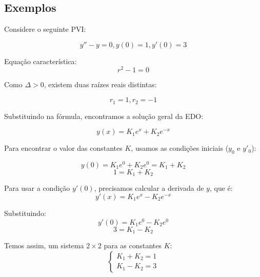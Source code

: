 \documentclass[a4paper]{article}
\begin{document}
\subsection{Exemplos}

\begin{multicols}{2}
Considere o seguinte PVI:

\begin{displaymath}
  y''-y=0, y(0)=1, y'(0)=3
\end{displaymath}

Equação característica:
\begin{displaymath}
  r^2-1=0
\end{displaymath}

Como $\Delta>0$, existem duas raízes reais distintas:

\begin{displaymath}
  r_1 = 1, r_2=-1
\end{displaymath}

Substituindo na fórmula, encontramos a solução geral da EDO:

\begin{displaymath}
  y(x) = K_1e^x+K_2e^{-x}
\end{displaymath}

Para encontrar o valor das constantes $K$, usamos as condições
iniciais ($y_0$ e $y'_0$):

\begin{displaymath}
  y(0) = K_1e^0+K_2e^0 = K_1 + K_2
\end{displaymath}
\begin{displaymath}
  1=K_1+K_2
\end{displaymath}

Para usar a condição $y'(0)$, precisamos calcular a derivada de $y$,
que é:
\begin{displaymath}
  y'(x) = K_1e^x-K_2e^{-x}
\end{displaymath}

Substituindo:
\begin{displaymath}
    y'(0) = K_1e^0-K_2e^0
\end{displaymath}
\begin{displaymath}
  3=K_1-K_2
\end{displaymath}

Temos assim, um sistema $2 \times 2$ para as constantes $K$:
\begin{displaymath}
  \left\{
    \begin{array}{l}
      K_1+K_2=1\\
      K_1-K_2=3
    \end{array}
\right.
\end{displaymath}


\end{multicols}
\end{document}
